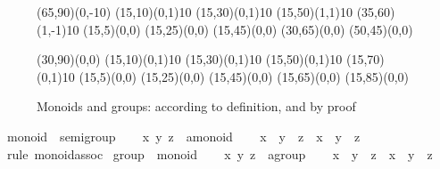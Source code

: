 \begin{isabellebody}
\begin{isamarkuptext}
 \begin{figure}[htbp]
   \begin{center}
     \small
     \unitlength 0.6mm
     \begin{picture}(65,90)(0,-10)
       \put(15,10){\line(0,1){10}} \put(15,30){\line(0,1){10}}
       \put(15,50){\line(1,1){10}} \put(35,60){\line(1,-1){10}}
       \put(15,5){\makebox(0,0){}}
       \put(15,25){\makebox(0,0){}}
       \put(15,45){\makebox(0,0){}}
       \put(30,65){\makebox(0,0){}} \put(50,45){\makebox(0,0){}}
     \end{picture}
     \hspace{4em}
     \begin{picture}(30,90)(0,0)
       \put(15,10){\line(0,1){10}} \put(15,30){\line(0,1){10}}
       \put(15,50){\line(0,1){10}} \put(15,70){\line(0,1){10}}
       \put(15,5){\makebox(0,0){}}
       \put(15,25){\makebox(0,0){}}
       \put(15,45){\makebox(0,0){}}
       \put(15,65){\makebox(0,0){}}
       \put(15,85){\makebox(0,0){}}
     \end{picture}
     \caption{Monoids and groups: according to definition, and by proof}
     \label{fig:monoid-group}
   \end{center}
 \end{figure}%
\end{isamarkuptext}%
\isamarkuptrue%
\ monoid\ {\isasymsubseteq}\ semigroup\isanewline
\isamarkupfalse%
\isanewline
\ \ \isamarkupfalse%
\ x\ y\ z\ {\isacharcolon}{\isacharcolon}\ {\isachardoublequote}{\isacharprime}a{\isasymColon}monoid{\isachardoublequote}\isanewline
\ \ \isamarkupfalse%
\ {\isachardoublequote}x\ {\isasymodot}\ y\ {\isasymodot}\ z\ {\isacharequal}\ x\ {\isasymodot}\ {\isacharparenleft}y\ {\isasymodot}\ z{\isacharparenright}{\isachardoublequote}\isanewline
\ \ \ \ \isamarkupfalse%
\ {\isacharparenleft}rule\ monoid{\isachardot}assoc{\isacharparenright}\isanewline
\isamarkupfalse%
\isanewline
\isanewline
\isamarkupfalse%
\ group\ {\isasymsubseteq}\ monoid\isanewline
\isamarkupfalse%
\isanewline
\ \ \isamarkupfalse%
\ x\ y\ z\ {\isacharcolon}{\isacharcolon}\ {\isachardoublequote}{\isacharprime}a{\isasymColon}group{\isachardoublequote}\isanewline
\ \ \isamarkupfalse%
\ {\isachardoublequote}x\ {\isasymodot}\ y\ {\isasymodot}\ z\ {\isacharequal}\ x\ {\isasymodot}\ {\isacharparenleft}y\ {\isasymodot}\ z{\isacharparenright}{\isachardoublequote}\isanewline

\end{isabellebody}
